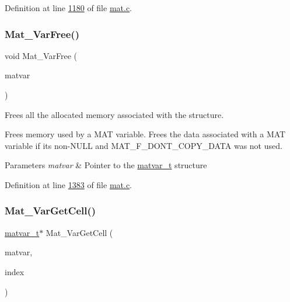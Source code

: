 Definition at line \hyperlink{mat_8c_source_l01180}{1180} of file \hyperlink{mat_8c_source}{mat.\+c}.

\mbox{\label{group___m_a_t_ga1d14716f7450530fd1c9d02413787f0e}} 
\subsubsection{\texorpdfstring{Mat\+\_\+\+Var\+Free()}{Mat\_VarFree()}}
{\footnotesize\ttfamily void Mat\+\_\+\+Var\+Free (\begin{DoxyParamCaption}\item[{\hyperlink{group___m_a_t_structmatvar__t}{matvar\+\_\+t} $\ast$}]{matvar }\end{DoxyParamCaption})}



Frees all the allocated memory associated with the structure. 

Frees memory used by a M\+AT variable. Frees the data associated with a M\+AT variable if it\textquotesingle{}s non-\/\+N\+U\+LL and M\+A\+T\+\_\+\+F\+\_\+\+D\+O\+N\+T\+\_\+\+C\+O\+P\+Y\+\_\+\+D\+A\+TA was not used.


\begin{DoxyParams}{Parameters}
{\em matvar} & Pointer to the \hyperlink{group___m_a_t_structmatvar__t}{matvar\+\_\+t} structure \\
\hline
\end{DoxyParams}


Definition at line \hyperlink{mat_8c_source_l01383}{1383} of file \hyperlink{mat_8c_source}{mat.\+c}.

\mbox{\label{group___m_a_t_gac1e15063439c0bd3eb0c986514c742dc}} 
\subsubsection{\texorpdfstring{Mat\+\_\+\+Var\+Get\+Cell()}{Mat\_VarGetCell()}}
{\footnotesize\ttfamily \hyperlink{group___m_a_t_structmatvar__t}{matvar\+\_\+t}$\ast$ Mat\+\_\+\+Var\+Get\+Cell (\begin{DoxyParamCaption}\item[{\hyperlink{group___m_a_t_structmatvar__t}{matvar\+\_\+t} $\ast$}]{matvar,  }\item[{int}]{index }\end{DoxyParamCaption})}



